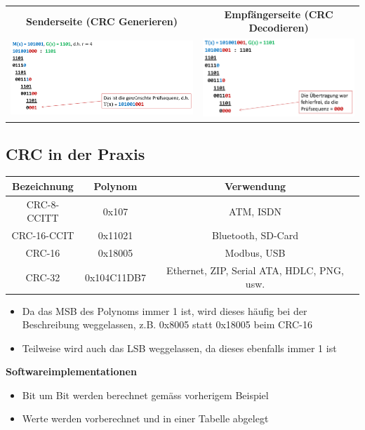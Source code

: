 \begin{tabular}{c|c}
	\textbf{Senderseite (CRC Generieren)} & \textbf{Empfängerseite (CRC Decodieren)} \\
	\includegraphics[width=9cm]{images/CRC/crc-gen.png} & \includegraphics[width=7cm]{images/CRC/crc-enc.png}  \\
\end{tabular}

\subsection{CRC in der Praxis}
\begin{tabular}{|c|c|c|}
\hline \textbf{Bezeichnung} & \textbf{Polynom} & \textbf{Verwendung} \\
\hline CRC-8-CCITT & 0x107 &  ATM, ISDN\\
\hline CRC-16-CCIT & 0x11021 & Bluetooth, SD-Card \\
\hline  CRC-16 & 0x18005  &  Modbus, USB\\
\hline  CRC-32 & 0x104C11DB7 & Ethernet, ZIP, Serial ATA, HDLC, PNG, usw. \\
\hline
\end{tabular}

\begin{itemize}
	\item Da das MSB des Polynoms immer 1 ist, wird dieses häufig bei der Beschreibung weggelassen, z.B. 0x8005 statt 0x18005 beim CRC-16
	\item Teilweise wird auch das LSB weggelassen, da dieses ebenfalls immer 1 ist
\end{itemize}

\textbf{Softwareimplementationen}
\begin{itemize}
	\item Bit um Bit werden berechnet gemäss vorherigem Beispiel
	\item Werte werden vorberechnet und in einer Tabelle abgelegt
\end{itemize}

